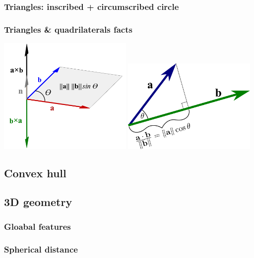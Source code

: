 \documentclass[a4paper]{article}
\begin{document}
\begin{multicols*}{2}
        \subsubsection{Triangles: inscribed + circumscribed circle}
            
        \subsubsection{Triangles \& quadrilaterals facts}
            
        \includegraphics[width=6.5cm]{../images/Cross-product-with-area.png}
        \includegraphics[width=6.5cm]{../images/dot_product_projection.png}
    \subsection{Convex hull}
        
    \subsection{3D geometry}
        \subsubsection{Gloabal features}
            
        \subsubsection{Spherical distance}
            


\end{multicols*}
\end{document}
